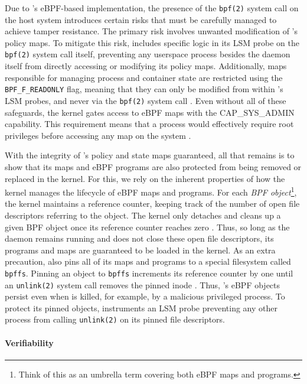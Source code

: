 Due to \bpfcontain{}'s eBPF-based implementation, the presence of the \texttt{bpf(2)} system call on the host system introduces certain risks that must be carefully managed to achieve tamper resistance. The primary risk involves unwanted modification of \bpfcontain{}'s policy maps. To mitigate this risk, \bpfcontain{} includes specific logic in its LSM probe on the \texttt{bpf(2)} system call itself, preventing any userspace process besides the \bpfcontain{} daemon itself from directly accessing or modifying its policy maps. Additionally, maps responsible for managing process and container state are restricted using the \texttt{BPF\_F\_READONLY} flag, meaning that they can only be modified from within \bpfcontain{}'s LSM probes, and never via the \texttt{bpf(2)} system call \cite{linux_bpf}. Even without all of these safeguards, the kernel gates access to eBPF maps with the CAP\_SYS\_ADMIN capability. This requirement means that a process would effectively require root privileges before accessing any map on the system \cite{linux_bpf}.

With the integrity of \bpfcontain{}'s policy and state maps guaranteed, all that remains is to show that its maps and eBPF programs are also protected from being removed or replaced in the kernel. For this, we rely on the inherent properties of how the kernel manages the lifecycle of eBPF maps and programs. For each \textit{BPF object}\footnote{Think of this as an umbrella term covering both eBPF maps and programs.}, the kernel maintains a reference counter, keeping track of the number of open file descriptors referring to the object. The kernel only detaches and cleans up a given BPF object once its reference counter reaches zero \cite{starovoitov2018_lifetime}. Thus, so long as the \bpfcontain{} daemon remains running and does not close these open file descriptors, its programs and maps are guaranteed to be loaded in the kernel. As an extra precaution, \bpfcontain{} also pins all of its maps and programs to a special filesystem called \texttt{bpffs}. Pinning an object to \texttt{bpffs} increments its reference counter by one until an \texttt{unlink(2)} system call removes the pinned inode \cite{starovoitov2018_lifetime}. Thus, \bpfcontain{}'s eBPF objects persist even when \bpfcontain{} is killed, for example, by a malicious privileged process. To protect its pinned objects, \bpfcontain{} instruments an LSM probe preventing any other process from calling \texttt{unlink(2)} on its pinned file descriptors.

\paragraph*{Verifiability}

